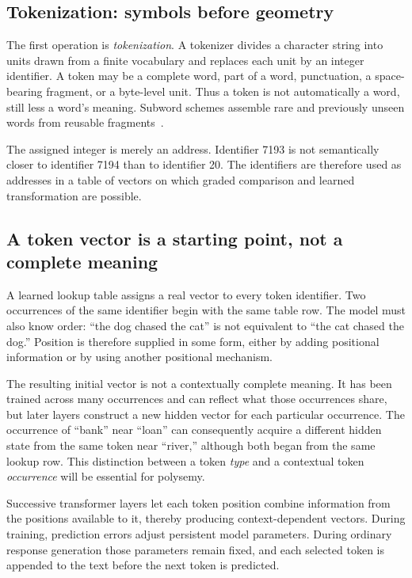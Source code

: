 \documentclass[
  aps,
  reprint,
  superscriptaddress,
  floatfix,
  nofootinbib,
  longbibliography
]{revtex4-2}
\begin{document}
\subsection{Tokenization: symbols before geometry}

The first operation is \emph{tokenization}.  A tokenizer divides a character
string into units drawn from a finite vocabulary and replaces each unit by an
integer identifier.  A token may be a complete word, part of a word,
punctuation, a space-bearing fragment, or a byte-level unit.  Thus a token is
not automatically a word, still less a word's meaning.  Subword schemes
assemble rare and previously unseen words from reusable
fragments~\cite{sennrich2016subword}.

The assigned integer is merely an address.  Identifier 7193 is not
semantically closer to identifier 7194 than to identifier 20.  The identifiers
are therefore used as addresses in a table of vectors on which graded
comparison and learned transformation are possible.

\subsection{A token vector is a starting point, not a complete meaning}

A learned lookup table assigns a real vector to every token identifier.  Two
occurrences of the same identifier begin with the same table row.  The model
must also know order: ``the dog chased the cat'' is not equivalent to ``the
cat chased the dog.''  Position is therefore supplied in some form, either by
adding positional information or by using another positional mechanism.

The resulting initial vector is not a contextually complete meaning.  It has
been trained across many occurrences and can reflect what those occurrences
share, but later layers construct a new hidden vector for each particular
occurrence.  The occurrence of ``bank'' near ``loan'' can consequently acquire
a different hidden state from the same token near ``river,'' although both
began from the same lookup row.  This distinction between a token \emph{type}
and a contextual token \emph{occurrence} will be essential for polysemy.

Successive transformer layers let each token position combine information from
the positions available to it, thereby producing context-dependent vectors.
During training, prediction errors adjust persistent model parameters.  During
ordinary response generation those parameters remain fixed, and each selected
token is appended to the text before the next token is predicted.
\end{document}
